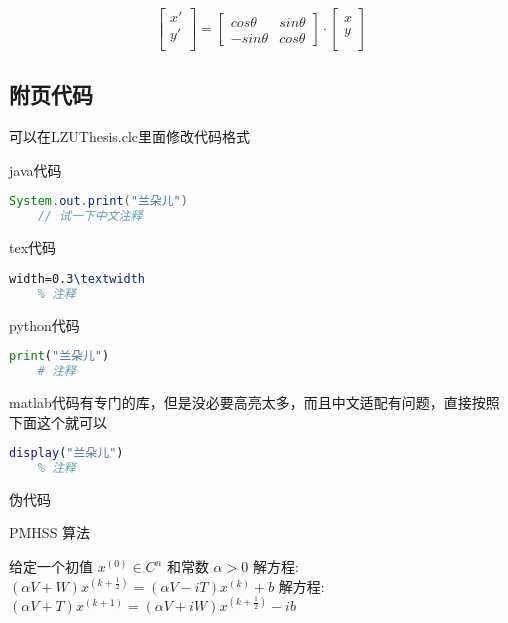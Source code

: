 \documentclass[AutoFakeBold]{LZUThesis}
\begin{document}
\begin{equation}
    \left[ 
    \begin{array}{c}
    x'\\
    y'\\
    \end{array}
    \right]=
    \left[ 
    \begin{array}{cc}
    cos \theta & sin \theta \\
    - sin \theta & cos \theta 
    \end{array}
    \right]
    \cdot
    \left[ 
    \begin{array}{c}
        x\\
        y\\
    \end{array}
    \right]
\end{equation}



\subsection{附页代码} %
\label{sub:附页代码}
可以在LZUThesis.clc里面修改代码格式

java代码
\begin{lstlisting}[language = java]
    System.out.print("兰朵儿")
    // 试一下中文注释
\end{lstlisting}


tex代码
\begin{lstlisting}[language = tex]
    width=0.3\textwidth
    % 注释
\end{lstlisting}

python代码
\begin{lstlisting}[language = python]
    print("兰朵儿")
    # 注释
\end{lstlisting}

matlab代码有专门的库，但是没必要高亮太多，而且中文适配有问题，直接按照下面这个就可以
\begin{lstlisting}[language = matlab]
    display("兰朵儿")
    % 注释
\end{lstlisting}


伪代码

\begin{algorithm}[H]
    \caption{PMHSS 算法\label{Alg:PMHSS}}
    \begin{algorithmic}[1]
      \State 给定一个初值 $ x^{(0)} \in C^{n} $  和常数 $\alpha>0$
      \State 解方程: $(\alpha V+W)x^{(k+\frac{1}{2})}=(\alpha V-i T)x^{(k)}+b $
      \State 解方程: $(\alpha V+T)x^{(k+1)}=(\alpha V+i W)x^{(k+\frac{1}{2})}-i b$
      \EndFor
    \end{algorithmic}
\end{algorithm}
\end{document}
